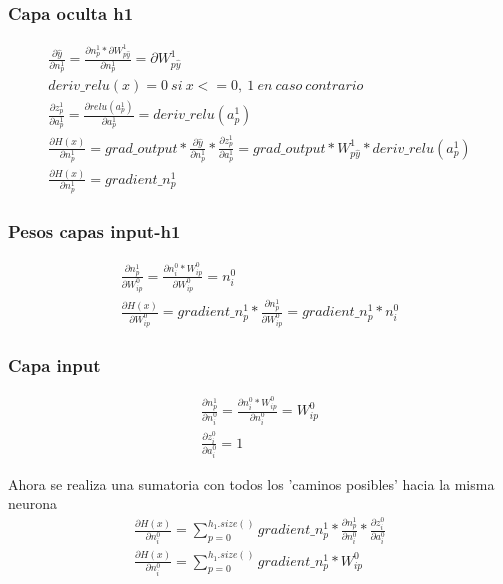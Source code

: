 \subsubsection{Capa oculta h1}

\begin{gather}
	\frac{\partial \hat{y}}{\partial n^1_p} = \frac{\partial n^1_p * \partial W^1 _{p\hat{y}} }{\partial n^1_p } = \partial W^1_{p\hat{y}} \\
	deriv\_relu(x) = 0\ si\ x <= 0,\ 1\ en\ caso\ contrario \\
	\frac{\partial z^1_p }{\partial a^1_p } = \frac{\partial relu(a^1_p)}{\partial a^1_p } = deriv\_relu(a^1_p) \\
	\frac{\partial H(x) }{\partial n^1_p } = grad\_output* \frac{\partial \hat{y} }{\partial n^1_p } * \frac{\partial z^1_p }{\partial a^1_p } = grad\_output * W^1_{p\hat{y} } * deriv\_relu(a^1_p ) \\
	\frac{\partial H(x) }{\partial n^1_p } = gradient\_n^1_p
\end{gather}

\subsubsection{Pesos capas input-h1}

\begin{gather}
	\frac{\partial n^1_p }{\partial W^0_{ip} } = \frac{\partial n^0_i * W^0_{ip} }{\partial W^0_{ip} } = n^0_i \\
	\frac{\partial H(x) }{\partial W^0_{ip} } = gradient\_n^1_p * \frac{\partial n^1_p }{\partial W^0_{ip} } = gradient\_n^1_p * n^0_i 
\end{gather}


\subsubsection{Capa input}

\begin{gather}
	\frac{\partial n^1_p }{\partial n^0_i } = \frac{\partial n^0_i * W^0_{ip} }{\partial n^0_i } = W^0_{ip} \\
	\frac{\partial z^0_i }{\partial a^0_i } = 1
\end{gather}

Ahora se realiza una sumatoria con todos los 'caminos posibles' hacia la misma neurona
\begin{gather}
	\frac{\partial H(x) }{\partial n^0_i } = \sum_{p=0}^{h_1.size()} gradient\_n^1_p * \frac{\partial n^1_p }{\partial n^0_i } * \frac{\partial z^0_i }{\partial a^0_i }  \\
	\frac{\partial H(x) }{\partial n^0_i } = \sum_{p=0}^{h_1.size()}  gradient\_n^1_p * W^0_{ip}
\end{gather}

